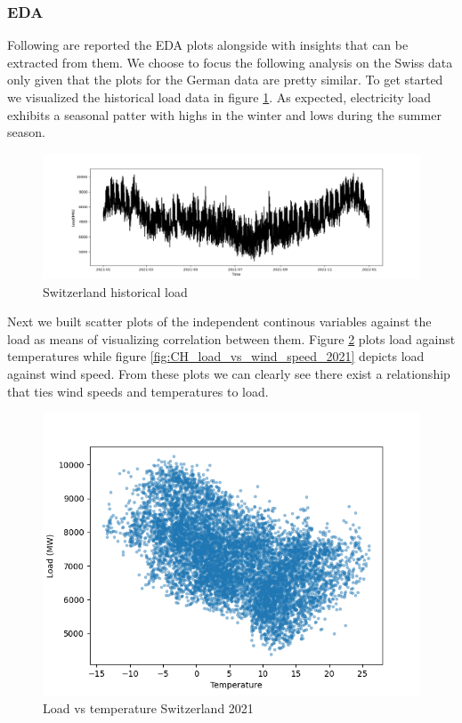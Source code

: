 \subsubsection{EDA}
Following are reported the EDA plots alongside with insights that can be extracted from them. We choose to focus the following analysis on the Swiss data only given that the plots for the German data are pretty similar.
To get started we visualized the historical load data in figure \ref{fig:CH_historical_load_2021}. As expected, electricity load exhibits a seasonal patter with highs in the winter and lows during the summer season.
\begin{figure}[!h]
    \includegraphics[width=\textwidth]{images/CH_historical_load_2021.png}
    \caption{Switzerland historical load}
    \label{fig:CH_historical_load_2021}
\end{figure}
Next we built scatter plots of the independent continous variables against the load as means of visualizing correlation between them.
Figure \ref{fig:CH_load_vs_temperature_2021} plots load against temperatures while figure \ref{fig:CH_load_vs_wind_speed_2021} depicts load against wind speed. From these plots we can clearly see there exist a relationship that ties wind speeds and temperatures to load.

\begin{figure}[!h]
    \includegraphics[width=\textwidth]{images/CH_load_vs_temperature_2021.png}
    \caption{Load vs temperature Switzerland 2021}
    \label{fig:CH_load_vs_temperature_2021}
\end{figure}

